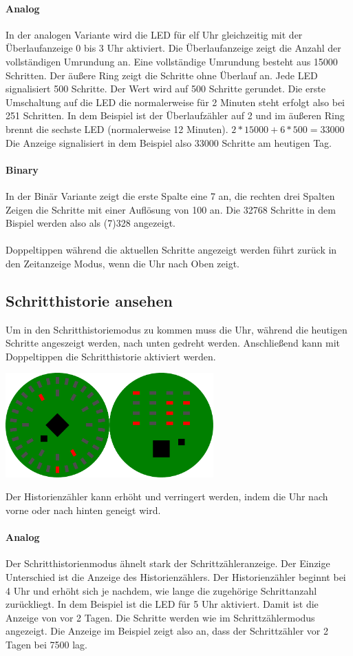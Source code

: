 \paragraph{Analog}
In der analogen Variante wird die LED für elf Uhr gleichzeitig mit der Überlaufanzeige 0 bis 3 Uhr aktiviert. Die Überlaufanzeige zeigt die Anzahl der vollständigen Umrundung an. Eine vollständige Umrundung besteht aus 15000 Schritten.
Der äußere Ring zeigt die Schritte ohne Überlauf an. Jede LED signalisiert 500 Schritte. Der Wert wird auf 500 Schritte gerundet. Die erste Umschaltung auf die LED die normalerweise für 2 Minuten steht erfolgt also bei 251 Schritten.
In dem Beispiel ist der Überlaufzähler auf 2 und im äußeren Ring brennt die sechste LED (normalerweise 12 Minuten).
$2*15000+6*500 = 33000$
Die Anzeige signalisiert in dem Beispiel also 33000 Schritte am heutigen Tag.
\paragraph{Binary}
In der Binär Variante zeigt die erste Spalte eine 7 an, die rechten drei Spalten Zeigen die Schritte mit einer Auflösung von 100 an.
Die 32768 Schritte in dem Bispiel werden also als (7)328 angezeigt.\\
\\
Doppeltippen während die aktuellen Schritte angezeigt werden führt zurück in den Zeitanzeige Modus, wenn die Uhr nach Oben zeigt.
\subsection{Schritthistorie ansehen}
Um in den Schritthistoriemodus zu kommen muss die Uhr, während die heutigen Schritte angeszeigt werden, nach unten gedreht werden. Anschließend kann mit Doppeltippen die Schritthistorie aktiviert werden.
\begin{center}
\includegraphics[width=0.6\textwidth]{../Graphics/ShowStepsHist_2Days_ago_7500}
\end{center}
Der Historienzähler kann erhöht und verringert werden, indem die Uhr nach vorne oder nach hinten geneigt wird.
\paragraph{Analog} 
Der Schritthistorienmodus ähnelt stark der Schrittzähleranzeige. Der Einzige Unterschied ist die Anzeige des Historienzählers.
Der Historienzähler beginnt bei 4 Uhr und erhöht sich je nachdem, wie lange die zugehörige Schrittanzahl zurückliegt. In dem Beispiel ist die LED für 5 Uhr aktiviert. Damit ist die Anzeige von vor 2 Tagen. Die Schritte werden wie im Schrittzählermodus angezeigt. Die Anzeige im Beispiel zeigt also an, dass der Schrittzähler vor 2 Tagen bei 7500 lag.
